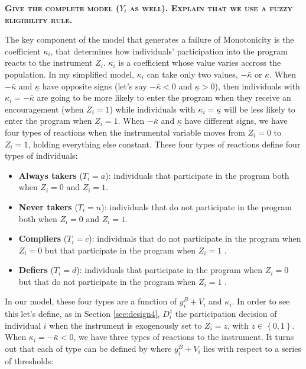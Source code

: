 \documentclass[]{book}
\providecommand{\tightlist}{%
  \setlength{\itemsep}{0pt}\setlength{\parskip}{0pt}}
\theoremstyle{definition}
\theoremstyle{definition}
\theoremstyle{definition}
\theoremstyle{remark}
\begin{document}
\textbf{\textsc{Give the complete model (\(Y_i\) as well). Explain that we use a fuzzy eligibility rule.}}

The key component of the model that generates a failure of Monotonicity is the coefficient \(\kappa_i\), that determines how individuals' participation into the program reacts to the instrument \(Z_i\).
\(\kappa_i\) is a coefficient whose value varies accross the population.
In my simplified model, \(\kappa_i\) can take only two values, \(-\bar{\kappa}\) or \(\underline{\kappa}\).
When \(-\bar{\kappa}\) and \(\underline{\kappa}\) have opposite signs (let's say \(-\bar{\kappa}<0\) and \(\underline{\kappa}>0\)), then individuals with \(\kappa_i=-\bar{\kappa}\) are going to be more likely to enter the program when they receive an encouragement (when \(Z_i=1\)) while individuals with \(\kappa_i=\underline{\kappa}\) will be less likely to enter the program when \(Z_i=1\).
When \(-\bar{\kappa}\) and \(\underline{\kappa}\) have different signs, we have four types of reactions when the instrumental variable moves from \(Z_i=0\) to \(Z_i=1\), holding everything else constant.
These four types of reactions define four types of individuals:

\begin{itemize}
\tightlist
\item
  \textbf{Always takers} (\(T_i=a\)): individuals that participate in the program both when \(Z_i=0\) and \(Z_i=1\).
\item
  \textbf{Never takers} (\(T_i=n\)): individuals that do not participate in the program both when \(Z_i=0\) and \(Z_i=1\).
\item
  \textbf{Compliers} (\(T_i=c\)): individuals that do not participate in the program when \(Z_i=0\) but that participate in the program when \(Z_i=1\) .
\item
  \textbf{Defiers} (\(T_i=d\)): individuals that participate in the program when \(Z_i=0\) but that do not participate in the program when \(Z_i=1\) .
\end{itemize}

In our model, these four types are a function of \(y_i^B+V_i\) and \(\kappa_i\).
In order to see this let's define, as in Section \ref{sec:design4}, \(D^z_i\) the participation decision of individual \(i\) when the instrument is exogenously set to \(Z_i=z\), with \(z\in\left\{0,1\right\}\).
When \(\kappa_i=-\bar{\kappa}<0\), we have three types of reactions to the instrument.
It turns out that each of type can be defined by where \(y_i^B+V_i\) lies with respect to a series of thresholds:
\end{document}
